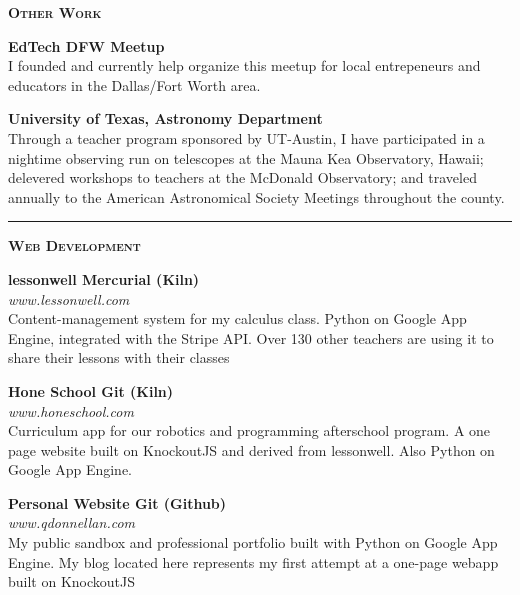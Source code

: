 \documentclass{article}
\begin{document}
\begin{multicols}{2}
\vspace{10pt} 
\textsc{\bfseries \Large Other Work} 
 \vspace{10pt} 

{\bfseries EdTech DFW Meetup } \\
I founded and currently help organize this meetup for local entrepeneurs and educators in the Dallas/Fort Worth area. 
\\
\vspace{10pt}

{\bfseries University of Texas, Astronomy Department} \\
Through a teacher program sponsored by UT-Austin, I have participated in a nightime observing run on telescopes at the Mauna Kea Observatory, Hawaii; delevered workshops to teachers at the McDonald Observatory; and traveled annually to the American Astronomical Society Meetings throughout the county. 
\\


\end{multicols}

\vspace{10pt} 

\begin{center}
\rule{\textwidth}{4pt}
\end{center}

\textsc{\bfseries \Large Web Development} \\

\begin{multicols}{3}

{\bfseries lessonwell \hfill Mercurial (Kiln)} \\
\textit{www.lessonwell.com} \\
Content-management system for my calculus class. Python on Google App Engine, integrated with the Stripe API. Over 130 other teachers are using it to share their lessons with their classes

\columnbreak

{\bfseries Hone School \hfill Git (Kiln)} \\
\textit{www.honeschool.com} \\
Curriculum app for our robotics and programming afterschool program. A one page website built on KnockoutJS and derived from lessonwell. Also Python on Google App Engine. 

\columnbreak

{\bfseries Personal Website \hfill Git (Github)} \\
\textit{www.qdonnellan.com} \\
My public sandbox and professional portfolio built with  Python on Google App Engine. My blog located here represents my first attempt at a one-page webapp built on KnockoutJS

\end{multicols}
\end{document}
